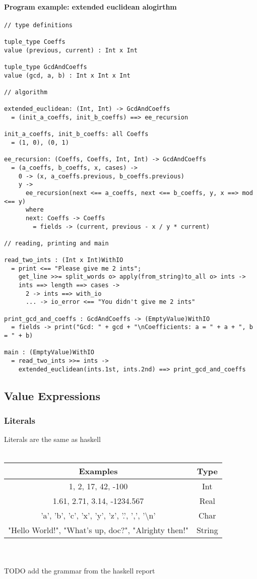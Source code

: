 \documentclass{article}
\begin{document}
\paragraph{Program example: extended euclidean alogirthm}
\begin{verbatim}
// type definitions

tuple_type Coeffs
value (previous, current) : Int x Int

tuple_type GcdAndCoeffs
value (gcd, a, b) : Int x Int x Int

// algorithm

extended_euclidean: (Int, Int) -> GcdAndCoeffs
  = (init_a_coeffs, init_b_coeffs) ==> ee_recursion

init_a_coeffs, init_b_coeffs: all Coeffs
  = (1, 0), (0, 1)

ee_recursion: (Coeffs, Coeffs, Int, Int) -> GcdAndCoeffs
  = (a_coeffs, b_coeffs, x, cases) ->
    0 -> (x, a_coeffs.previous, b_coeffs.previous)
    y ->
      ee_recursion(next <== a_coeffs, next <== b_coeffs, y, x ==> mod <== y)
      where
      next: Coeffs -> Coeffs
        = fields -> (current, previous - x / y * current)

// reading, printing and main

read_two_ints : (Int x Int)WithIO
  = print <== "Please give me 2 ints";
    get_line >>= split_words o> apply(from_string)to_all o> ints ->
    ints ==> length ==> cases ->
      2 -> ints ==> with_io
      ... -> io_error <== "You didn't give me 2 ints"
 
print_gcd_and_coeffs : GcdAndCoeffs -> (EmptyValue)WithIO
  = fields -> print("Gcd: " + gcd + "\nCoefficients: a = " + a + ", b = " + b)

main : (EmptyValue)WithIO
  = read_two_ints >>= ints ->
    extended_euclidean(ints.1st, ints.2nd) ==> print_gcd_and_coeffs
\end{verbatim}

\subsection{Value Expressions}

\subsubsection{Literals}

Literals are the same as haskell \\ \\
\begin{tabular}{ |c|c| } 
\hline
Examples & Type \\ 
\hline
\hline
1, 2, 17, 42, -100 & Int \\ 
\hline
1.61, 2.71, 3.14, -1234.567 & Real \\ 
\hline
'a', 'b', 'c', 'x', 'y', 'z', '.', ',', '\textbackslash n' & Char \\
\hline
"Hello World!", "What's up, doc?", "Alrighty then!" & String \\
\hline
\end{tabular}
\\\\
TODO add the grammar from the haskell report
\end{document}
